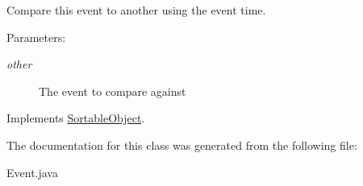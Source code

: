 Compare this event to another using the event time. 

\begin{Desc}
\item[Parameters:]
\begin{description}
\item[{\em other}]The event to compare against \end{description}
\end{Desc}


Implements \hyperlink{class_sortable_object_b8f80361da32c8b04d89116993e60847}{SortableObject}.

The documentation for this class was generated from the following file:\begin{CompactItemize}
\item 
Event.java\end{CompactItemize}
